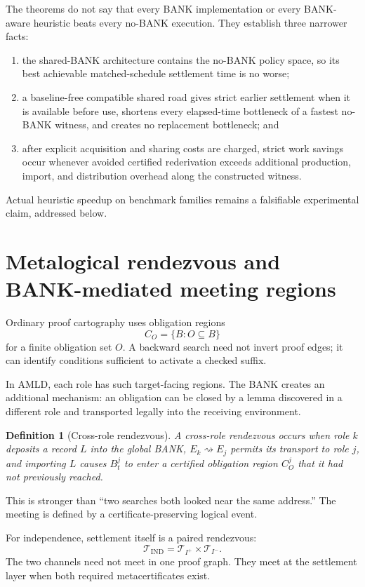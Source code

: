 \documentclass[11pt]{article}
\newtheorem{definition}{Definition}[section]
\newcommand{\IND}{\mathrm{IND}}
\begin{document}
The theorems do not say that every BANK implementation or every BANK-aware heuristic beats every no-BANK execution. They establish three narrower facts:
\begin{enumerate}[label=(\arabic*)]
\item the shared-BANK architecture contains the no-BANK policy space, so its best achievable matched-schedule settlement time is no worse;
\item a baseline-free compatible shared road gives strict earlier settlement when it is available before use, shortens every elapsed-time bottleneck of a fastest no-BANK witness, and creates no replacement bottleneck; and
\item after explicit acquisition and sharing costs are charged, strict work savings occur whenever avoided certified rederivation exceeds additional production, import, and distribution overhead along the constructed witness.
\end{enumerate}
Actual heuristic speedup on benchmark families remains a falsifiable experimental claim, addressed below.

\section{Metalogical rendezvous and BANK-mediated meeting regions}

Ordinary proof cartography uses obligation regions
\[
C_O=\{B:O\subseteq B\}
\]
for a finite obligation set $O$. A backward search need not invert proof edges; it can identify conditions sufficient to activate a checked suffix.

In AMLD, each role has such target-facing regions. The BANK creates an additional mechanism: an obligation can be closed by a lemma discovered in a different role and transported legally into the receiving environment.

\begin{definition}[Cross-role rendezvous]
A \emph{cross-role rendezvous} occurs when role $k$ deposits a record $L$ into the global BANK, $E_k\rightsquigarrow E_j$ permits its transport to role $j$, and importing $L$ causes $B_t^j$ to enter a certified obligation region $C_O^j$ that it had not previously reached.
\end{definition}

This is stronger than ``two searches both looked near the same address.'' The meeting is defined by a certificate-preserving logical event.

For independence, settlement itself is a paired rendezvous:
\[
\mathcal T_{\IND}=\mathcal T_{I^+}\times\mathcal T_{I^-}.
\]
The two channels need not meet in one proof graph. They meet at the settlement layer when both required metacertificates exist.
\end{document}
